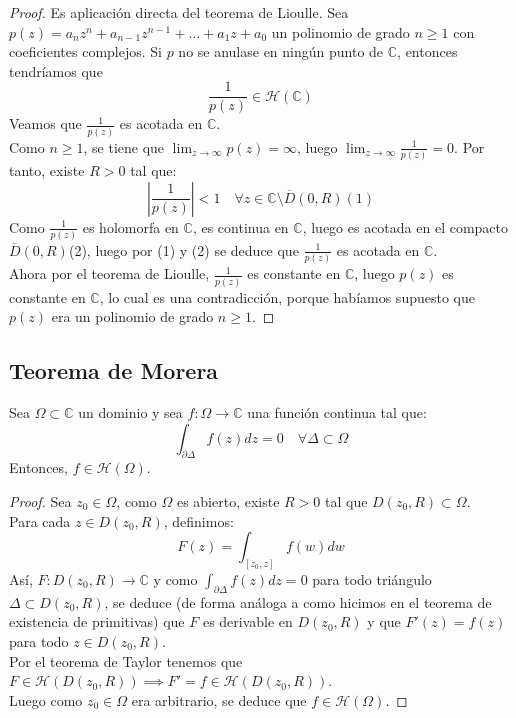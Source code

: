 \begin{proof}
    Es aplicación directa del teorema de Lioulle. Sea $p(z) = a_n z^n + a_{n-1} z^{n-1} + \ldots + a_1 z + a_0$ un polinomio de grado $n \geq 1$ con coeficientes complejos. Si $p$ no se anulase en ningún punto de $\mathbb{C}$, entonces tendríamos que 
    \[
        \frac{1}{p(z)} \in \mathcal{H}(\mathbb{C})
    \]
    Veamos que $\frac{1}{p(z)}$ es acotada en $\mathbb{C}$.\\
    Como $n \geq 1$, se tiene que $\lim_{z \to \infty} p(z) = \infty$, luego $\lim_{z \to \infty} \frac{1}{p(z)} = 0$. Por tanto, existe $R > 0$ tal que:
    \[
        \left| \frac{1}{p(z)} \right| < 1 \quad \forall z \in \mathbb{C} \setminus \overline{D}(0, R)(1)
    \]
    Como $\frac{1}{p(z)}$ es holomorfa en $\mathbb{C}$, es continua en $\mathbb{C}$, luego es acotada en el compacto $\overline{D}(0, R)$(2), luego por (1) y (2) se deduce que $\frac{1}{p(z)}$ es acotada en $\mathbb{C}$.\\
    Ahora por el teorema de Lioulle, $\frac{1}{p(z)}$ es constante en $\mathbb{C}$, luego $p(z)$ es constante en $\mathbb{C}$, lo cual es una contradicción, porque habíamos supuesto que $p(z)$ era un polinomio de grado $n \geq 1$. 
\end{proof}

\subsection{Teorema de Morera}
\begin{teorema} 
    Sea $\Omega \subset \mathbb{C}$ un dominio y sea $f : \Omega \to \mathbb{C}$ una función continua tal que:
    \[
        \int_{\partial \Delta} f(z) dz = 0 \quad \forall \Delta \subset \Omega
    \]
    Entonces, $f \in \mathcal{H}(\Omega)$.    
\end{teorema}

\begin{proof}
    Sea $z_0 \in \Omega$, como $\Omega$ es abierto, existe $R > 0$ tal que $D(z_0, R) \subset \Omega$.\\
    Para cada $z \in D(z_0, R)$, definimos:
    \[
        F(z) = \int_{[z_0, z]} f(w) dw
    \]
    Así, $F : D(z_0,R) \to \mathbb{C}$ y como $\int_{\partial \Delta} f(z) dz = 0$ para todo triángulo $\Delta \subset D(z_0, R)$, se deduce (de forma análoga a como hicimos en el teorema de existencia de primitivas) que $F$ es derivable en $D(z_0, R)$ y que $F'(z) = f(z)$ para todo $z \in D(z_0, R)$.\\
    Por el teorema de Taylor tenemos que $F \in \mathcal{H}(D(z_0, R)) \implies F' = f \in \mathcal{H}(D(z_0, R))$.\\
    Luego como $z_0 \in \Omega$ era arbitrario, se deduce que $f \in \mathcal{H}(\Omega)$.
\end{proof}

